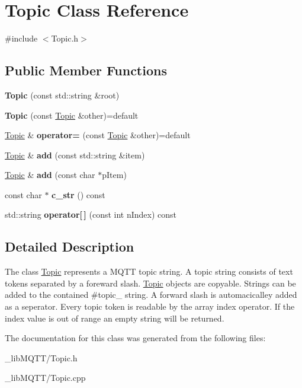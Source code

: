 \hypertarget{class_topic}{}\section{Topic Class Reference}
\label{class_topic}


{\ttfamily \#include $<$Topic.\+h$>$}

\subsection*{Public Member Functions}
\begin{DoxyCompactItemize}
\item 
\mbox{\label{class_topic_a4e2b337c972d1766c80b48e4981eb47f}} 
{\bfseries Topic} (const std\+::string \&root)
\item 
\mbox{\label{class_topic_a5650ccda9f2d99bfd54e90e1f92bc7b2}} 
{\bfseries Topic} (const \mbox{\hyperlink{class_topic}{Topic}} \&other)=default
\item 
\mbox{\label{class_topic_a744c65ee1c771c392945fe1eba061b7d}} 
\mbox{\hyperlink{class_topic}{Topic}} \& {\bfseries operator=} (const \mbox{\hyperlink{class_topic}{Topic}} \&other)=default
\item 
\mbox{\label{class_topic_abce06cc663933929b9636f9c3f1e3a39}} 
\mbox{\hyperlink{class_topic}{Topic}} \& {\bfseries add} (const std\+::string \&item)
\item 
\mbox{\label{class_topic_a340aa8d9fa92ad882f72f3fdb333a62a}} 
\mbox{\hyperlink{class_topic}{Topic}} \& {\bfseries add} (const char $\ast$p\+Item)
\item 
\mbox{\label{class_topic_a7b21b34698aae44f2f2e807ae7885602}} 
const char $\ast$ {\bfseries c\+\_\+str} () const
\item 
\mbox{\label{class_topic_a6115050735610e27263eb2412ff56fd8}} 
std\+::string {\bfseries operator\mbox{[}$\,$\mbox{]}} (const int n\+Index) const
\end{DoxyCompactItemize}


\subsection{Detailed Description}
The class \mbox{\hyperlink{class_topic}{Topic}} represents a M\+Q\+TT topic string. A topic string consists of text tokens separated by a foreward slash. \mbox{\hyperlink{class_topic}{Topic}} objects are copyable. Strings can be added to the contained \#topic\+\_\+ string. A forward slash is automacicalley added as a seperator. Every topic token is readable by the array index operator. If the index value is out of range an empty string will be returned. 

The documentation for this class was generated from the following files\+:\begin{DoxyCompactItemize}
\item 
\+\_\+lib\+M\+Q\+T\+T/Topic.\+h\item 
\+\_\+lib\+M\+Q\+T\+T/Topic.\+cpp\end{DoxyCompactItemize}
